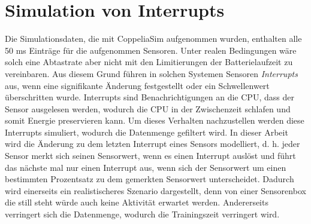 \section{Simulation von Interrupts}
Die Simulationsdaten, die mit CoppeliaSim aufgenommen wurden, enthalten alle 50 ms Einträge für die aufgenommen Sensoren.
Unter realen Bedingungen wäre solch eine Abtastrate aber nicht mit den Limitierungen der Batterielaufzeit zu vereinbaren.
Aus diesem Grund führen in solchen Systemen Sensoren \textit{Interrupts} aus, wenn eine signifikante Änderung festgestellt oder ein Schwellenwert überschritten wurde.
Interrupts sind Benachrichtigungen an die CPU, dass der Sensor ausgelesen werden, wodurch die CPU in der Zwischenzeit schlafen und somit Energie preservieren kann.
\newline
\newline
Um dieses Verhalten nachzustellen werden diese Interrupts simuliert, wodurch die Datenmenge gefiltert wird.
In dieser Arbeit wird die Änderung zu dem letzten Interrupt eines Sensors modelliert,
d. h. jeder Sensor merkt sich seinen Sensorwert, wenn es einen Interrupt auslöst
und führt das nächste mal nur einen Interrupt aus, wenn sich der Sensorwert um einen bestimmten Prozentsatz zu dem gemerkten Sensorwert unterscheidet.
\newline
\newline
Dadurch wird einerseits ein realistischeres Szenario dargestellt,
denn von einer Sensorenbox die still steht würde auch keine Aktivität erwartet werden.
Andererseits verringert sich die Datenmenge, wodurch die Trainingszeit verringert wird.

\iffalse
\newline
\newline
Allerdings hat sich gezeigt, dass manche Standorte deutlich unterrepräsentiert sind in der Trainingsmenge.
Aus diesem Grund wurde zusätzlich für die Trainingsmenge eine Mindestabtastrate von 4 Hertz eingeführt,
falls in diesem Zeitraum kein Interrupt für diesen Standort stattgefunden hat.
\fi